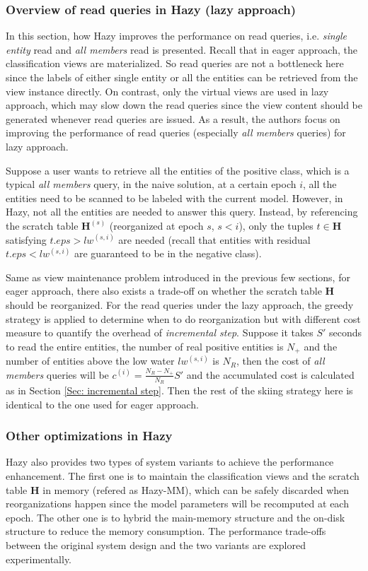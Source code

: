 
\subsubsection{Overview of read queries in Hazy (lazy approach)}
In this section, how Hazy improves the performance on read queries, i.e. {\em single entity} read and {\em all members} read is presented. Recall that in eager approach, the classification views are materialized. So read queries are not a bottleneck here since the labels of either single entity or all the entities can be retrieved from the view instance directly. On contrast, only the virtual views are used in lazy approach, which may slow down the read queries since the view content should be generated whenever read queries are issued. As a result, the authors focus on improving the performance of read queries (especially {\em all members} queries) for lazy approach.

Suppose a user wants to retrieve all the entities of the positive class, which is a typical {\em all members} query, in the naive solution, at a certain epoch $i$, all the entities need to be scanned to be labeled with the current model. However, in Hazy, not all the entities are needed to answer this query. Instead, by referencing the scratch table $\textbf{H}^{(s)}$ (reorganized at epoch $s$, $s < i$), only the tuples $t \in \textbf{H}$ satisfying $t.eps > lw^{(s,i)}$ are needed (recall that entities with residual $t.eps < lw^{(s,i)}$ are guaranteed to be in the negative class). 

Same as view maintenance problem introduced in the previous few sections, for eager approach, there also exists a trade-off on whether the scratch table $\textbf{H}$ should be reorganized. For the read queries under the lazy approach, the greedy strategy is applied to determine when to do reorganization but with different cost measure to quantify the overhead of {\em incremental step}. Suppose it takes $S'$ seconds to read the entire entities, the number of real positive entities is $N_{+}$ and the number of entities above the low water $lw^{(s,i)}$ is $N_{R}$, then the cost of {\em all members} queries will be $c^{(i)} = \frac{N_{R}-N_{+}}{N_{R}}S'$ and the accumulated cost is calculated as in Section \ref{Sec: incremental step}. Then the rest of the skiing strategy here is identical to the one used for eager approach.


\subsubsection{Other optimizations in Hazy}
Hazy also provides two types of system variants to achieve the performance enhancement. The first one is to maintain the classification views and the scratch table $\textbf{H}$ in memory (refered as Hazy-MM), which can be safely discarded when reorganizations happen since the model parameters will be recomputed at each epoch. The other one is to hybrid the main-memory structure and the on-disk structure to reduce the memory consumption. The performance trade-offs between the original system design and the two variants are explored experimentally.

